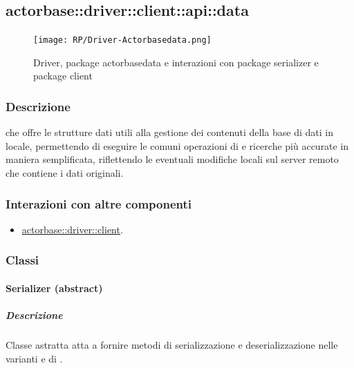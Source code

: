 \documentclass{scalatekids-article}
\begin{document}

\subsection{actorbase::driver::client::api::data}
\label{sec:actorbase::driver::client::api::data}

\begin{figure}[H]
  \begin{center}
    \texttt{[image: RP/Driver-Actorbasedata.png]}
    \caption{Driver, package actorbasedata e interazioni con package serializer e package client}
  \end{center}
\end{figure}

\subsubsection{Descrizione}

 che offre le strutture dati utili alla gestione dei contenuti
della base di dati in locale, permettendo di eseguire le comuni operazioni di
 e ricerche più accurate in maniera semplificata, riflettendo le
eventuali modifiche locali sul server remoto che contiene i dati originali.

\subsubsection{Interazioni con altre componenti}
\begin{itemize}
\item \hyperref[sec:actorbase::driver::client]{actorbase::driver::client}.
\end{itemize}

\subsubsection{Classi}

\paragraph{Serializer (abstract)}
\label{sec:actorbase::driver::client::data::Serializer}

\subparagraph{Descrizione}

Classe astratta atta a fornire metodi di serializzazione e deserializzazione nelle
varianti  e  di .
\end{document}
